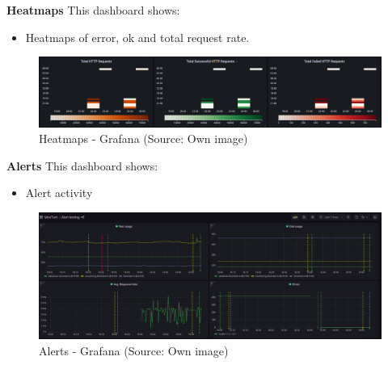 \textbf{Heatmaps}
This dashboard shows:
\begin{itemize}
    \item Heatmaps of error, ok and total request rate.
\end{itemize}
\begin{figure}[H]
    \centering
    \includegraphics[width = \linewidth]{images/monitoring/Grafana_Heatmaps.png}
    \caption{Heatmaps - Grafana (Source: Own image)}
    \label{fig:grafana-dashboard-Heatmaps}
\end{figure}
\newpage
\textbf{Alerts}
This dashboard shows:
\begin{itemize}
    \item Alert activity
\end{itemize}
\begin{figure}[H]
    \centering
    \includegraphics[width = \linewidth]{images/monitoring/Grafana_Alerts.png}
    \caption{Alerts - Grafana (Source: Own image)}
    \label{fig:grafana-dashboard-Alerts}
\end{figure}